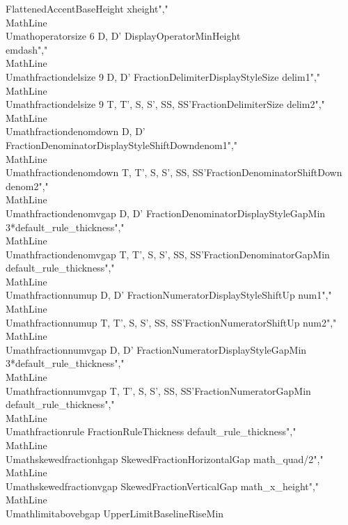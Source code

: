 {FlattenedAccentBaseHeight}               {xheight}","\\MathLine{\\Umathoperatorsize}             {6}  {D, D'}                {DisplayOperatorMinHeight}                {\\emdash}","\\MathLine{\\Umathfractiondelsize}          {9}  {D, D'}                {FractionDelimiterDisplayStyleSize}       {delim1}","\\MathLine{\\Umathfractiondelsize}          {9}  {T, T', S, S', SS, SS'}{FractionDelimiterSize}                   {delim2}","\\MathLine{\\Umathfractiondenomdown}        {}   {D, D'}                {FractionDenominatorDisplayStyleShiftDown}{denom1}","\\MathLine{\\Umathfractiondenomdown}        {}   {T, T', S, S', SS, SS'}{FractionDenominatorShiftDown}            {denom2}","\\MathLine{\\Umathfractiondenomvgap}        {}   {D, D'}                {FractionDenominatorDisplayStyleGapMin}   {3*default_rule_thickness}","\\MathLine{\\Umathfractiondenomvgap}        {}   {T, T', S, S', SS, SS'}{FractionDenominatorGapMin}               {default_rule_thickness}","\\MathLine{\\Umathfractionnumup}            {}   {D, D'}                {FractionNumeratorDisplayStyleShiftUp}    {num1}","\\MathLine{\\Umathfractionnumup}            {}   {T, T', S, S', SS, SS'}{FractionNumeratorShiftUp}                {num2}","\\MathLine{\\Umathfractionnumvgap}          {}   {D, D'}                {FractionNumeratorDisplayStyleGapMin}     {3*default_rule_thickness}","\\MathLine{\\Umathfractionnumvgap}          {}   {T, T', S, S', SS, SS'}{FractionNumeratorGapMin}                 {default_rule_thickness}","\\MathLine{\\Umathfractionrule}             {}   {}                     {FractionRuleThickness}                   {default_rule_thickness}","\\MathLine{\\Umathskewedfractionhgap}       {}   {}                     {SkewedFractionHorizontalGap}             {math_quad/2}","\\MathLine{\\Umathskewedfractionvgap}       {}   {}                     {SkewedFractionVerticalGap}               {math_x_height}","\\MathLine{\\Umathlimitabovebgap}           {}   {}                     {UpperLimitBaselineRiseMin}               